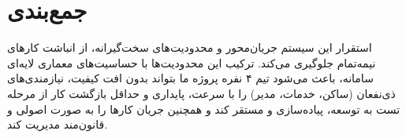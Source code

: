\chapter{جمع‌بندی} استقرار این سیستم جریان‌محور و محدودیت‌های سخت‌گیرانه، از انباشت کارهای نیمه‌تمام جلوگیری می‌کند. ترکیب این محدودیت‌ها با حساسیت‌های معماری لایه‌ای سامانه، باعث می‌شود تیم ۴ نفره پروژه ما بتواند بدون افت کیفیت، نیازمندی‌های ذی‌نفعان (ساکن، خدمات، مدیر) را با سرعت، پایداری و حداقل بازگشت کار از مرحله تست به توسعه، پیاده‌سازی و مستقر کند و همچنین جریان کارها را به صورت اصولی و قانون‌مند مدیریت کند.